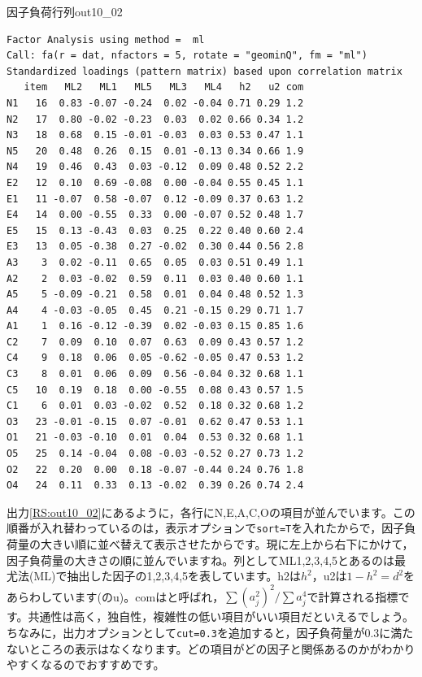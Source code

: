 \documentclass{ltjsbook}
\begin{document}
\begin{Rscreen}{因子負荷行列}{out10_02}
	\begin{verbatim}
Factor Analysis using method =  ml
Call: fa(r = dat, nfactors = 5, rotate = "geominQ", fm = "ml")
Standardized loadings (pattern matrix) based upon correlation matrix
   item   ML2   ML1   ML5   ML3   ML4   h2   u2 com
N1   16  0.83 -0.07 -0.24  0.02 -0.04 0.71 0.29 1.2
N2   17  0.80 -0.02 -0.23  0.03  0.02 0.66 0.34 1.2
N3   18  0.68  0.15 -0.01 -0.03  0.03 0.53 0.47 1.1
N5   20  0.48  0.26  0.15  0.01 -0.13 0.34 0.66 1.9
N4   19  0.46  0.43  0.03 -0.12  0.09 0.48 0.52 2.2
E2   12  0.10  0.69 -0.08  0.00 -0.04 0.55 0.45 1.1
E1   11 -0.07  0.58 -0.07  0.12 -0.09 0.37 0.63 1.2
E4   14  0.00 -0.55  0.33  0.00 -0.07 0.52 0.48 1.7
E5   15  0.13 -0.43  0.03  0.25  0.22 0.40 0.60 2.4
E3   13  0.05 -0.38  0.27 -0.02  0.30 0.44 0.56 2.8
A3    3  0.02 -0.11  0.65  0.05  0.03 0.51 0.49 1.1
A2    2  0.03 -0.02  0.59  0.11  0.03 0.40 0.60 1.1
A5    5 -0.09 -0.21  0.58  0.01  0.04 0.48 0.52 1.3
A4    4 -0.03 -0.05  0.45  0.21 -0.15 0.29 0.71 1.7
A1    1  0.16 -0.12 -0.39  0.02 -0.03 0.15 0.85 1.6
C2    7  0.09  0.10  0.07  0.63  0.09 0.43 0.57 1.2
C4    9  0.18  0.06  0.05 -0.62 -0.05 0.47 0.53 1.2
C3    8  0.01  0.06  0.09  0.56 -0.04 0.32 0.68 1.1
C5   10  0.19  0.18  0.00 -0.55  0.08 0.43 0.57 1.5
C1    6  0.01  0.03 -0.02  0.52  0.18 0.32 0.68 1.2
O3   23 -0.01 -0.15  0.07 -0.01  0.62 0.47 0.53 1.1
O1   21 -0.03 -0.10  0.01  0.04  0.53 0.32 0.68 1.1
O5   25  0.14 -0.04  0.08 -0.03 -0.52 0.27 0.73 1.2
O2   22  0.20  0.00  0.18 -0.07 -0.44 0.24 0.76 1.8
O4   24  0.11  0.33  0.13 -0.02  0.39 0.26 0.74 2.4
\end{verbatim}
\end{Rscreen}
出力\ref{RS:out10_02}にあるように，各行にN,E,A,C,Oの項目が並んでいます。この順番が入れ替わっているのは，表示オプションで\verb|sort=T|を入れたからで，因子負荷量の大きい順に並べ替えて表示させたからです。現に左上から右下にかけて，因子負荷量の大きさの順に並んでいますね。列としてML1,2,3,4,5とあるのは最尤法(ML)で抽出した因子の1,2,3,4,5を表しています。h2は$h^2$，u2は$1-h^2=d^2$をあらわしています(のu)。comはと呼ばれ，$\sum (a_j^2)^2/\sum a_j^4$で計算される指標です。共通性は高く，独自性，複雑性の低い項目がいい項目だといえるでしょう。ちなみに，出力オプションとして\verb|cut=0.3|を追加すると，因子負荷量が0.3に満たないところの表示はなくなります。どの項目がどの因子と関係あるのかがわかりやすくなるのでおすすめです。
\end{document}
